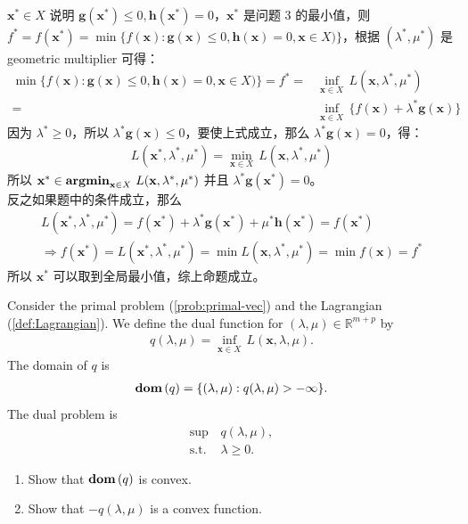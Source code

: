 \documentclass[11pt,letter,notitlepage]{article}
\DeclareMathOperator*{\argmin}{\bf argmin}
\DeclareMathOperator*{\dom}{\bf dom\,}
\begin{document}
\begin{solution}
	\heiti
	\ \\
	$\mathbf{x}^* \in X$ 说明 $\mathbf{g}(\mathbf{x^*}) \leqslant 0, \mathbf{h}(\mathbf{x^*}) = 0$，$\mathbf{x}^*$ 是问题 3 的最小值，则 $f^* = f(\mathbf{x}^*) = \min\{f(\mathbf{x}):\mathbf{g}(\mathbf{x})\leq0,\mathbf{h}(\mathbf{x})=0,\mathbf{x}\in X)\}$，根据 $(\lambda^*,\mu^*)$ 是 geometric multiplier 可得：
	\begin{align*}
		\min\{f(\mathbf{x}):\mathbf{g}(\mathbf{x})\leq0,\mathbf{h}(\mathbf{x})=0,\mathbf{x}\in X)\} = f^* = & \inf_{\mathbf{x}\in X}\,L(\mathbf{x},\lambda^*,\mu^*)\\
		= & \inf_{\mathbf{x}\in X}\,\{f(\mathbf{x})+\lambda^* \mathbf{g}(\mathbf{x})\}
	\end{align*}
	因为 $\lambda^* \geqslant 0$，所以 $\lambda^* \mathbf{g}(\mathbf{x}) \leqslant 0$，要使上式成立，那么 $\lambda^* \mathbf{g}(\mathbf{x}) = 0$，得：
	\begin{align*}
		L(\mathbf{x}^*,\lambda^*,\mu^*) = \min_{\mathbf{x}\in X}\,L(\mathbf{x},\lambda^*,\mu^*)
	\end{align*}
	所以 $\mathbf{x}^*\in\argmin_{\mathbf{x}\in X}\,L(\mathbf{x},\lambda^*,\mu^*)$ 并且 $\lambda^* \mathbf{g}(\mathbf{x}^*) = 0$。\\
	反之如果题中的条件成立，那么
	\begin{align*}
		L(\mathbf{x}^*,\lambda^*,\mu^*) = f(\mathbf{x}^*) + \lambda^*\mathbf{g}(\mathbf{x}^*) + \mu^*\mathbf{h}(\mathbf{x}^*) = f(\mathbf{x}^*)\\
		\Rightarrow f(\mathbf{x}^*) = L(\mathbf{x}^*,\lambda^*,\mu^*) = \min L(\mathbf{x},\lambda^*,\mu^*) = \min f(\mathbf{x}) = f^*
	\end{align*}
	所以 $\mathbf{x}^*$ 可以取到全局最小值，综上命题成立。
\end{solution}

\newpage
\begin{exercise}
Consider the primal problem (\ref{prob:primal-vec}) and the Lagrangian (\ref{def:Lagrangian}). We define the dual function for $(\lambda,\mu)\in\mathbb{R}^{m+p}$ by
\begin{align*}
	q(\lambda,\mu)=\inf_{\mathbf{x}\in X}\,L(\mathbf{x},\lambda,\mu).
\end{align*}
The domain of $q$ is 
\begin{align*}
    \dom(q)=\{(\lambda,\mu):q(\lambda,\mu)>-\infty\}.
\end{align*}
The dual problem is
\begin{align*}
	\sup\,&q(\lambda,\mu),\\
	\mbox{s.t. }&\lambda\geq0.
\end{align*}
\begin{enumerate}
    \item Show that $\dom(q)$ is convex.
    \item Show that $-q(\lambda,\mu)$ is a convex function.
\end{enumerate}
\end{exercise}
\end{document}
